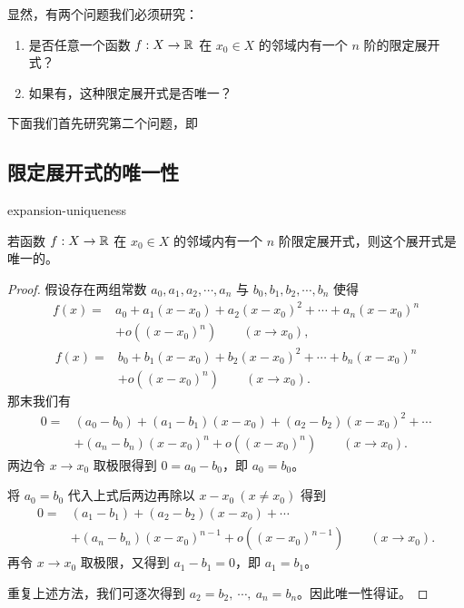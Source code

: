 显然，有两个问题我们必须研究：

\begin{enumerate}[label=\arabic{enumi})]
\item 是否任意一个函数 $f:X\to\mathbb{R}$ 在 $x_0\in X$ 的邻域内有一个 $n$ 阶的限定展开式？
\item 如果有，这种限定展开式是否唯一？
\end{enumerate}

下面我们首先研究第二个问题，即

\subsection{限定展开式的唯一性}

\begin{mythm}{}{expansion-uniqueness}

若函数 $f:X\to\mathbb{R}$ 在 $x_0\in X$ 的邻域内有一个 $n$ 阶限定展开式，则这个展开式是唯一的。

\end{mythm}

\begin{proof}

假设存在两组常数 $a_0,a_1,a_2,\cdots,a_n$ 与 $b_0,b_1,b_2,\cdots,b_n$ 使得
\[\begin{aligned}
f(x)={}&a_0+a_1(x-x_0)+a_2(x-x_0)^2+\cdots+a_n(x-x_0)^n\\
&+o((x-x_0)^n)\qquad(x\to x_0),
\end{aligned}\]
\[\begin{aligned}
f(x)={}&b_0+b_1(x-x_0)+b_2(x-x_0)^2+\cdots+b_n(x-x_0)^n\\
&+o((x-x_0)^n)\qquad(x\to x_0).
\end{aligned}\]
那末我们有
\[\begin{aligned}
0={}&(a_0-b_0)+(a_1-b_1)(x-x_0)+(a_2-b_2)(x-x_0)^2+\cdots\\
&+(a_n-b_n)(x-x_0)^n+o((x-x_0)^n)\qquad(x\to x_0).
\end{aligned}\]
两边令 $x\to x_0$ 取极限得到 $0=a_0-b_0$，即 $a_0=b_0$。

将 $a_0=b_0$ 代入上式后两边再除以 $x-x_0\ (x\neq x_0)$ 得到
\[\begin{aligned}
0={}&(a_1-b_1)+(a_2-b_2)(x-x_0)+\cdots\\
&+(a_n-b_n)(x-x_0)^{n-1}+o((x-x_0)^{n-1})\qquad(x\to x_0).
\end{aligned}\]
再令 $x\to x_0$ 取极限，又得到 $a_1-b_1=0$，即 $a_1=b_1$。

重复上述方法，我们可逐次得到 $a_2=b_2,\ \cdots,\ a_n=b_n$。因此唯一性得证。

\end{proof}

